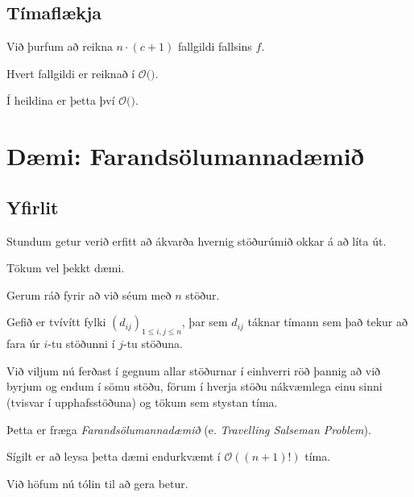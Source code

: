 \subsection{Tímaflækja}
{
    {
        \item<1-> Við þurfum að reikna $n \cdot (c + 1)$ fallgildi fallsins $f$.
        \item<2-> Hvert fallgildi er reiknað í $\mathcal{O}($$)$.
        \item<4-> Í heildina er þetta því $\mathcal{O}($$)$.
    }
}

\section{Dæmi: Farandsölumannadæmið}
\subsection{Yfirlit}
{
    {
        \item<1-> Stundum getur verið erfitt að ákvarða hvernig stöðurúmið okkar á að líta út.
        \item<2-> Tökum vel þekkt dæmi.
        \item<3-> Gerum ráð fyrir að við séum með $n$ stöður.
        \item<4-> Gefið er tvívítt fylki $(d_{ij})_{1 \leq i, j \leq n}$,
            þar sem $d_{ij}$ táknar tímann sem það tekur að fara úr $i$-tu stöðunni í $j$-tu stöðuna.
        \item<5-> Við viljum nú ferðast í gegnum allar stöðurnar í einhverri röð þannig að við	
            byrjum og endum í sömu stöðu, förum í hverja stöðu nákvæmlega einu sinni (tvisvar í upphafsstöðuna) og tökum sem stystan tíma.
        \item<6-> Þetta er fræga \emph{Farandsölumannadæmið} (e. \emph{Travelling Salseman Problem}).
        \item<7-> Sígilt er að leysa þetta dæmi endurkvæmt í $\mathcal{O}((n + 1)!)$ tíma.
        \item<8-> Við höfum nú tólin til að gera betur.
    }
}

